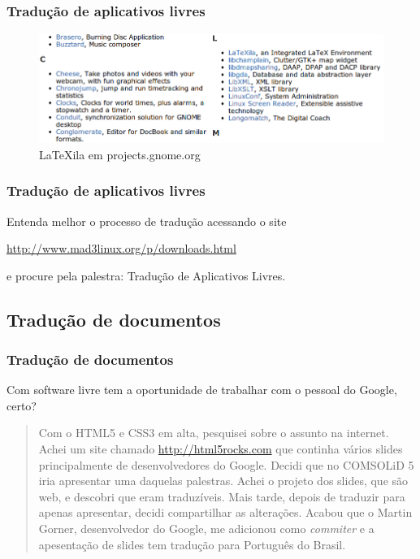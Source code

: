 \begin{frame}\frametitle{Tradução de aplicativos livres}

\begin{figure}
   \includegraphics[scale=0.35]{img/latexila-1.png}
   \caption{LaTeXila em projects.gnome.org}
\end{figure}

\end{frame}

\begin{frame}[fragile]\frametitle{Tradução de aplicativos livres}

Entenda melhor o processo de tradução acessando o site

\url{http://www.mad3linux.org/p/downloads.html}

e procure pela palestra: Tradução de Aplicativos Livres.

\end{frame}

\begin{frame}\frametitle{}


\end{frame}

\subsection{Tradução de documentos}

\begin{frame}[fragile]\frametitle{Tradução de documentos}

Com software livre tem a oportunidade de trabalhar com o pessoal do
Google, certo?

\begin{quote}
Com o HTML5 e CSS3 em alta, pesquisei sobre o assunto na internet. Achei
um site chamado \url{http://html5rocks.com} que continha vários slides
principalmente de desenvolvedores do Google. Decidi que no COMSOLiD 5
iria apresentar uma daquelas palestras. Achei o projeto dos slides, que
são web, e descobri que eram traduzíveis. Mais tarde, depois de traduzir
para apenas apresentar, decidi compartilhar as alterações. Acabou que o
Martin Gorner, desenvolvedor do Google, me adicionou como
\emph{commiter} e a apesentação de slides tem tradução para Português do
Brasil.

\end{quote}
\end{frame}

